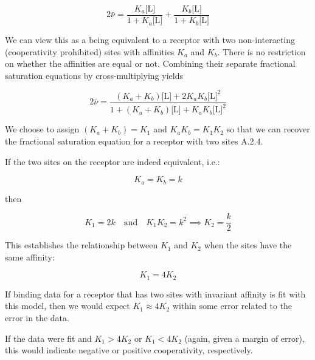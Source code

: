 \begin{equation}
	2  \bar{\nu} = \frac{K_a \text{[L]}}{1+K_a \text{[L]}} + \frac{K_b \text{[L]}}{1+K_b \text{[L]}}
\end{equation}

We can view this as a being equivalent to a receptor with two non-interacting (cooperativity prohibited) sites with affinities \(K_a\) and \(K_b\). There is no restriction on whether the affinities are equal or not. Combining their separate fractional saturation equations by cross-multiplying yields

\begin{equation}
	2  \bar{\nu} = \frac{(K_a + K_b)\text{[L]} + 2 K_a K_b \text{[L]}^2}{1 + (K_a + K_b)\text{[L]} + K_a K_b \text{[L]}^2}
\end{equation}

We choose to assign \((K_a + K_b) = K_1\) and \(K_a K_b = K_1 K_2\) so that we can recover the fractional saturation equation for a receptor with two sites A.2.4. 

If the two sites on the receptor are indeed equivalent, i.e.:

\begin{equation}
K_a = K_b = k
\end{equation}

then 

\begin{equation}
K_1 = 2k \quad \text{and} \quad K_1 K_2 = k^2 \implies K_2 = \frac{k}{2}
\end{equation}

This establishes the relationship between \(K_1\) and \(K_2\) when the sites have the same affinity:

\begin{equation}
	K_1 = 4 K_2
\end{equation}

If binding data for a receptor that has two sites with invariant affinity is fit with this model, then we would expect \(K_1 \approx 4 K_2\) within some error related to the error in the data.

If the data were fit and \(K_1 > 4 K_2 \) or \(K_1 < 4 K_2 \) (again, given a margin of error), this would indicate negative or positive cooperativity, respectively.



\clearpage
